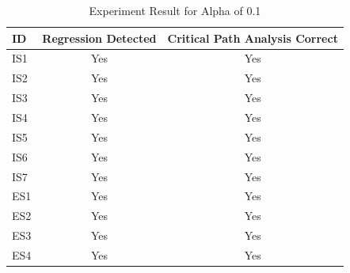 \documentclass[conference]{configs/IEEEtran}
\begin{document}
\begin{table}[!htb]
	\caption{Experiment Result for Alpha of 0.1}
	\label{test-1}
	\centering
	\begin{tabular}{|l|c|c|}
		\hline
		\textbf{ID} & \multicolumn{1}{l|}{\textbf{Regression Detected}} & \multicolumn{1}{l|}{\textbf{Critical Path Analysis Correct}} \\ \hline
		IS1 & Yes & Yes \\ \hline
		IS2 & Yes & Yes \\ \hline
		IS3 & Yes & Yes \\ \hline
		IS4 & Yes & Yes \\ \hline
		IS5 & Yes & Yes \\ \hline
		IS6 & Yes & Yes \\ \hline
		IS7 & Yes & Yes \\ \hline
		ES1 & Yes & Yes \\ \hline
		ES2 & Yes & Yes \\ \hline
		ES3 & Yes & Yes \\ \hline
		ES4 & Yes & Yes \\ \hline
	\end{tabular}
\end{table}
\end{document}
